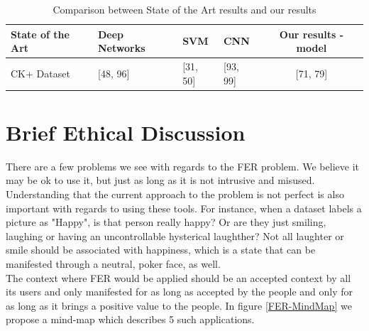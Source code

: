 \documentclass[runningheads,a4paper,11pt]{report}
\begin{document}
\begin{table}[htbp]
	\caption{Comparison between State of the Art results and our results}
	\label{state_of_the_art_comparison}
		\begin{center}
			\begin{tabular}{p{100pt}p{100pt}p{60pt}p{60pt}c}
				\textbf{State of the Art}& \textbf{Deep Networks \cite{Samadiani19}}& \textbf{SVM \cite{Samadiani19}}& \textbf{CNN \cite{Burkert16}}& \textbf{Our results - model \cite{Arriaga17}} \\
				\hline\hline
				CK+ Dataset& [48, 96]& [31, 50]& [93, 99]& [71, 79] \\
				\hline
			\end{tabular}
		\end{center}
\end{table}

\section{Brief Ethical Discussion}
\label{section:ethical}

There are a few problems we see with regards to the FER problem. We believe it may be ok to use it, but just as long as it is not intrusive and misused. \\
Understanding that the current approach to the problem is not perfect is also important with regards to using these tools. For instance, when a dataset labels a picture as "Happy", is that person really happy? Or are they just smiling, laughing or having an uncontrollable hysterical laughther? Not all laughter or smile should be associated with happiness, which is a state that can be manifested through a neutral, poker face, as well. \\
The context where FER would be applied should be an accepted context by all its users and only manifested for as long as accepted by the people and only for as long as it brings a positive value to the people. In figure \ref{FER-MindMap} we propose a mind-map which describes 5 such applications.
\end{document}
